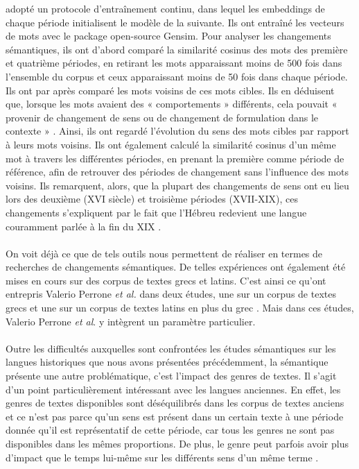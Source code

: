 \documentclass{article}
\begin{document}
adopté un protocole d’entraînement continu, dans lequel les embeddings de chaque période initialisent le modèle de la suivante. Ils ont entraîné les vecteurs de mots avec le package open-source Gensim. Pour analyser les changements sémantiques, ils ont d’abord comparé la similarité cosinus des mots des première et quatrième périodes, en retirant les mots apparaissant moins de 500 fois dans l’ensemble du corpus et ceux apparaissant moins de 50 fois dans chaque période. Ils ont par après comparé les mots voisins de ces mots cibles. Ils en déduisent que, lorsque les mots avaient des « comportements » différents, cela pouvait « provenir de changement de sens ou de changement de formulation dans le contexte » \cite{liebeskind2020deep}. Ainsi, ils ont regardé l’évolution du sens des mots cibles par rapport à leurs mots voisins. Ils ont également calculé la similarité cosinus d’un même mot à travers les différentes périodes, en prenant la première comme période de référence, afin de retrouver des périodes de changement sans l’influence des mots voisins. Ils remarquent, alors, que la plupart des changements de sens ont eu lieu lors des deuxième (XVI siècle) et troisième périodes (XVII-XIX), ces changements s’expliquent par le fait que l’Hébreu redevient une langue couramment parlée à la fin du XIX \cite{liebeskind2020deep}. 
\paragraph{}
On voit déjà ce que de tels outils nous permettent de réaliser en termes de recherches de changements sémantiques. De telles expériences ont également été mises en cours sur des corpus de textes grecs et latins. C’est ainsi ce qu’ont entrepris Valerio Perrone \textit{et al.} dans deux études, une sur un corpus de textes grecs \cite{perrone2019gasc} et une sur un corpus de textes latins en plus du grec \cite{perrone2021lexical}. Mais dans ces études, Valerio Perrone \textit{et al}. y intègrent un paramètre particulier. 
\paragraph{}
Outre les difficultés auxquelles sont confrontées les études sémantiques sur les langues historiques que nous avons présentées précédemment, la sémantique présente une autre problématique, c’est l’impact des genres de textes. Il s’agit d’un point particulièrement intéressant avec les langues anciennes. En effet, les genres de textes disponibles sont déséquilibrés dans les corpus de textes anciens \cite{perrone2019gasc} et ce n’est pas parce qu’un sens est présent dans un certain texte à une période donnée qu’il est représentatif de cette période, car tous les genres ne sont pas disponibles dans les mêmes proportions. De plus, le genre peut parfois avoir plus d’impact que le temps lui-même sur les différents sens d’un même terme \cite{perrone2019gasc}. 
\end{document}
